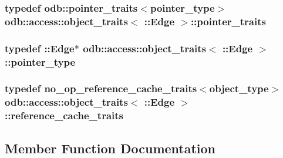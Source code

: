 \subsubsection[{pointer\+\_\+traits}]{\setlength{\rightskip}{0pt plus 5cm}typedef odb\+::pointer\+\_\+traits$<${\bf pointer\+\_\+type}$>$ odb\+::access\+::object\+\_\+traits$<$ \+::{\bf Edge} $>$\+::{\bf pointer\+\_\+traits}}\label{classodb_1_1access_1_1object__traits_3_01_1_1_edge_01_4_ab9aae724e12acc5ce3a479fa5d4a70aa}
\hypertarget{classodb_1_1access_1_1object__traits_3_01_1_1_edge_01_4_a6a628367452cbd6238b20d5cddbaadb5}{}
\subsubsection[{pointer\+\_\+type}]{\setlength{\rightskip}{0pt plus 5cm}typedef \+::{\bf Edge}$\ast$ odb\+::access\+::object\+\_\+traits$<$ \+::{\bf Edge} $>$\+::{\bf pointer\+\_\+type}}\label{classodb_1_1access_1_1object__traits_3_01_1_1_edge_01_4_a6a628367452cbd6238b20d5cddbaadb5}
\hypertarget{classodb_1_1access_1_1object__traits_3_01_1_1_edge_01_4_a54ca62d99b19a28da216205b7facfdf0}{}
\subsubsection[{reference\+\_\+cache\+\_\+traits}]{\setlength{\rightskip}{0pt plus 5cm}typedef no\+\_\+op\+\_\+reference\+\_\+cache\+\_\+traits$<${\bf object\+\_\+type}$>$ odb\+::access\+::object\+\_\+traits$<$ \+::{\bf Edge} $>$\+::{\bf reference\+\_\+cache\+\_\+traits}}\label{classodb_1_1access_1_1object__traits_3_01_1_1_edge_01_4_a54ca62d99b19a28da216205b7facfdf0}


\subsection{Member Function Documentation}
\hypertarget{classodb_1_1access_1_1object__traits_3_01_1_1_edge_01_4_aba3b2f5ad8baa4d95d48acfe22b31ffe}{}
